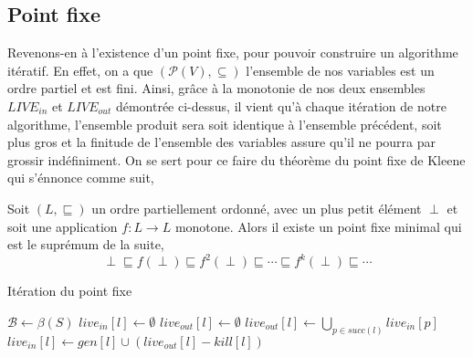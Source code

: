 \documentclass[a4paper, 12pt]{article}
\begin{document}
\subsection{Point fixe}
Revenons-en à l'existence d'un point fixe, pour pouvoir construire un algorithme itératif. En effet,
on a que $(\mathcal{P}(V), \subseteq)$ l'ensemble de nos variables est un ordre partiel et est fini.
Ainsi, grâce à la monotonie de nos deux ensembles $LIVE_{in}$ et $LIVE_{out}$ démontrée ci-dessus, il
vient qu'à chaque itération de notre algorithme, l'ensemble produit sera soit identique à l'ensemble précédent,
soit plus gros et la finitude de l'ensemble des variables assure qu'il ne pourra par grossir indéfiniment. On se sert pour ce faire
du théorème du point fixe de Kleene qui s'énnonce comme suit,
\newline
\newline
\begin{theorem}	
	Soit $(L, \sqsubseteq)$ un ordre partiellement ordonné, avec un plus petit élément  $\perp$ et soit
	une application $f : L \longrightarrow L$ monotone. Alors il existe un point fixe minimal qui est le suprémum de la suite,
	\[\perp \sqsubseteq f(\perp) \sqsubseteq f^2(\perp) \sqsubseteq \cdots \sqsubseteq f^k(\perp) \sqsubseteq \cdots\]
\end{theorem}

\begin{algorithm}
	\caption{Itération du point fixe}
	\begin{algorithmic}
		\State $\mathcal{B} \leftarrow \beta(S)$
		\State $live_{in}[l] \leftarrow \emptyset$
		\State $live_{out}[l] \leftarrow \emptyset$
		\EndFor
		\State $live_{out}[l] \leftarrow \bigcup\limits_{p\in succ(l)} live_{in}[p]$
		\State $live_{in}[l] \leftarrow gen[l] \cup (live_{out}[l] - kill[l])$
		\EndFor
		\EndWhile
	\end{algorithmic}
\end{algorithm}
\end{document}
